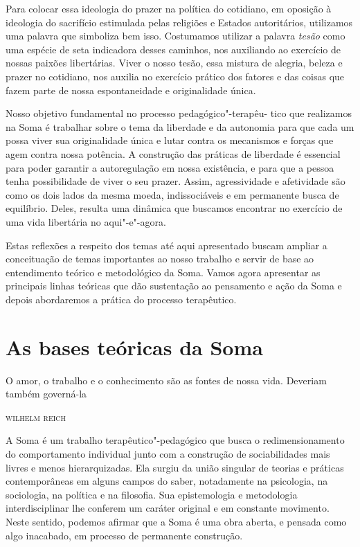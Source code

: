 Para colocar essa ideologia do prazer na política do cotidiano, em
oposição à ideologia do sacrifício estimulada pelas religiões e Estados
autoritários, utilizamos uma palavra que simboliza bem isso. Costumamos
utilizar a palavra \emph{tesão} como uma espécie de seta indicadora
desses caminhos, nos auxiliando ao exercício de nossas paixões
libertárias. Viver o nosso tesão, essa mistura de alegria, beleza e
prazer no cotidiano, nos auxilia no exercício prático dos fatores e das
coisas que fazem parte de nossa espontaneidade e originalidade única.

Nosso objetivo fundamental no processo pedagógico"-terapêu- tico que
realizamos na Soma é trabalhar sobre o tema da liberdade e da autonomia
para que cada um possa viver sua originalidade única e lutar contra os
mecanismos e forças que agem contra nossa potência. A construção das
práticas de liberdade é essencial para poder garantir a autoregulação em
nossa existência, e para que a pessoa tenha possibilidade de viver o seu
prazer. Assim, agressividade e afetividade são como os dois lados da
mesma moeda, indissociáveis e em permanente busca de equilíbrio. Deles,
resulta uma dinâmica que buscamos encontrar no exercício de uma vida
libertária no aqui"-e"-agora.

Estas reflexões a respeito dos temas até aqui apresentado buscam ampliar
a conceituação de temas importantes ao nosso trabalho e servir de base
ao entendimento teórico e metodológico da Soma. Vamos agora apresentar
as principais linhas teóricas que dão sustentação ao pensamento e ação
da Soma e depois abordaremos a prática do processo terapêutico.

\chapter{As bases teóricas da Soma}

\epigraph{O amor, o trabalho e o conhecimento são as fontes de nossa vida.
Deveriam também governá-la}{\textsc{wilhelm reich}}

A Soma é um trabalho terapêutico"-pedagógico que busca o
redimensionamento do comportamento individual junto com a construção de
sociabilidades mais livres e menos hierarquizadas. Ela surgiu da união
singular de teorias e práticas contemporâneas em alguns campos do saber,
notadamente na psicologia, na sociologia, na política e na filosofia.
Sua epistemologia e metodologia interdisciplinar lhe conferem um caráter
original e em constante movimento. Neste sentido, podemos afirmar que a
Soma é uma obra aberta, e pensada como algo inacabado, em processo de
permanente construção.


